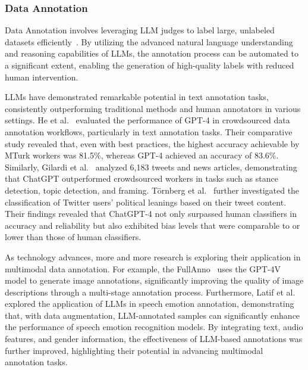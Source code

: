\subsubsection{Data Annotation}
\label{sec:Data Annotation}
Data Annotation involves leveraging LLM judges to label large, unlabeled datasets efficiently~\cite{he2024if,gilardi2023chatgpt,tornberg2023chatgpt,hao2024fullanno}. By utilizing the advanced natural language understanding and reasoning capabilities of LLMs, the annotation process can be automated to a significant extent, enabling the generation of high-quality labels with reduced human intervention.

LLMs have demonstrated remarkable potential in text annotation tasks, consistently outperforming traditional methods and human annotators in various settings.
He et al.~\cite{he2024if} evaluated the performance of GPT-4 in crowdsourced data annotation workflows, particularly in text annotation tasks. Their comparative study revealed that, even with best practices, the highest accuracy achievable by MTurk workers was 81.5\%, whereas GPT-4 achieved an accuracy of 83.6\%.
Similarly, Gilardi et al.~\cite{gilardi2023chatgpt} analyzed 6,183 tweets and news articles, demonstrating that ChatGPT outperformed crowdsourced workers in tasks such as stance detection, topic detection, and framing.
Törnberg et al.~\cite{tornberg2023chatgpt} further investigated the classification of Twitter users' political leanings based on their tweet content. Their findings revealed that ChatGPT-4 not only surpassed human classifiers in accuracy and reliability but also exhibited bias levels that were comparable to or lower than those of human classifiers.


As technology advances, more and more research is exploring their application in multimodal data annotation. For example, the FullAnno~\cite{hao2024fullanno} uses the GPT-4V model to generate image annotations, significantly improving the quality of image descriptions through a multi-stage annotation process.
Furthermore, Latif et al.~\cite{latif2023can} explored the application of LLMs in speech emotion annotation, demonstrating that, with data augmentation, LLM-annotated samples can significantly enhance the performance of speech emotion recognition models. By integrating text, audio features, and gender information, the effectiveness of LLM-based annotations was further improved, highlighting their potential in advancing multimodal annotation tasks.


